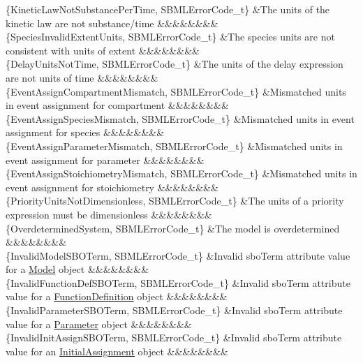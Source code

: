 \begin{DoxyParagraph}{}
\begin{longtabu}
\{Kinetic\+Law\+Not\+Substance\+Per\+Time, S\+B\+M\+L\+Error\+Code\+\_\+t\} &The units of the kinetic law are not \textquotesingle{}substance\textquotesingle{}/\textquotesingle{}time\textquotesingle{} &&&&&&&&\\
\{Species\+Invalid\+Extent\+Units, S\+B\+M\+L\+Error\+Code\+\_\+t\} &The species\textquotesingle{} units are not consistent with units of extent &&&&&&&&\\
\{Delay\+Units\+Not\+Time, S\+B\+M\+L\+Error\+Code\+\_\+t\} &The units of the delay expression are not units of time &&&&&&&&\\
\{Event\+Assign\+Compartment\+Mismatch, S\+B\+M\+L\+Error\+Code\+\_\+t\} &Mismatched units in event assignment for compartment &&&&&&&&\\
\{Event\+Assign\+Species\+Mismatch, S\+B\+M\+L\+Error\+Code\+\_\+t\} &Mismatched units in event assignment for species &&&&&&&&\\
\{Event\+Assign\+Parameter\+Mismatch, S\+B\+M\+L\+Error\+Code\+\_\+t\} &Mismatched units in event assignment for parameter &&&&&&&&\\
\{Event\+Assign\+Stoichiometry\+Mismatch, S\+B\+M\+L\+Error\+Code\+\_\+t\} &Mismatched units in event assignment for stoichiometry &&&&&&&&\\
\{Priority\+Units\+Not\+Dimensionless, S\+B\+M\+L\+Error\+Code\+\_\+t\} &The units of a priority expression must be \textquotesingle{}dimensionless\textquotesingle{} &&&&&&&&\\
\{Overdetermined\+System, S\+B\+M\+L\+Error\+Code\+\_\+t\} &The model is overdetermined &&&&&&&&\\
\{Invalid\+Model\+S\+B\+O\+Term, S\+B\+M\+L\+Error\+Code\+\_\+t\} &Invalid \textquotesingle{}sbo\+Term\textquotesingle{} attribute value for a \hyperlink{class_model}{Model} object &&&&&&&&\\
\{Invalid\+Function\+Def\+S\+B\+O\+Term, S\+B\+M\+L\+Error\+Code\+\_\+t\} &Invalid \textquotesingle{}sbo\+Term\textquotesingle{} attribute value for a \hyperlink{class_function_definition}{Function\+Definition} object &&&&&&&&\\
\{Invalid\+Parameter\+S\+B\+O\+Term, S\+B\+M\+L\+Error\+Code\+\_\+t\} &Invalid \textquotesingle{}sbo\+Term\textquotesingle{} attribute value for a \hyperlink{class_parameter}{Parameter} object &&&&&&&&\\
\{Invalid\+Init\+Assign\+S\+B\+O\+Term, S\+B\+M\+L\+Error\+Code\+\_\+t\} &Invalid \textquotesingle{}sbo\+Term\textquotesingle{} attribute value for an \hyperlink{class_initial_assignment}{Initial\+Assignment} object &&&&&&&&\\

\end{longtabu}
\end{DoxyParagraph}
